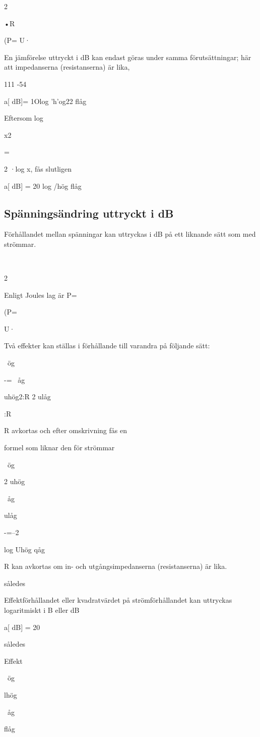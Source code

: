 {{2

•R

(P= U·~

En jämförelse uttryckt i dB kan endast göras
under samma förutsättningar; här att impedanserna (resistanserna) är lika,

111 -54

a[ dB]= 1Olog 'h'og22
flåg

Eftersom log

x2

=

2 ·log x, fås slutligen

a[ dB] = 20 log /hög
flåg

\subsection{Spänningsändring uttryckt i dB}
Förhållandet mellan spänningar kan uttryckas i dB på ett liknande sätt som med
strömmar.

~

2

Enligt Joules lag är P=

(P=

U·~

Två effekter kan ställas i förhållande till varandra på följande sätt:

~ög

-=
~åg

uhög2:R
2
ulåg

:R

R avkortas och efter omskrivning fås en

formel som liknar den för strömmar

~ög

2
uhög

~åg

ulåg

-=--2

log Uhög
qåg

R kan avkortas om in- och utgångsimpedanserna (resistanserna) är lika.

således

Effektförhållandet eller kvadratvärdet på
strömförhållandet kan uttryckas logaritmiskt
i B eller dB

a[ dB] = 20

således

Effekt

~ög

lhög

~åg

flåg

}}
